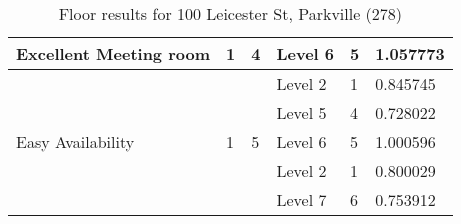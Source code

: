 \begin{table}[H]
{\begin{tabular}{|l|l|l|l|l|l|}
Excellent Meeting room & 1                       & 4                                & Level 6              & 5             & 1.057773        \\ \hline
                      &                         &                                  & Level 2              & 1             & 0.845745        \\ \hline
                      &                         &                                  & Level 5              & 4             & 0.728022        \\ \hline
Easy Availability      & 1                       & 5                                & Level 6              & 5             & 1.000596        \\ \hline
                      &                         &                                  & Level 2              & 1             & 0.800029        \\ \hline
                      &                         &                                  & Level 7              & 6             & 0.753912        \\ \hline
\end{tabular}
}
\caption{Floor results for 100 Leicester St, Parkville (278)}
\label{appendix:edu_mr_floor}
\end{table}



